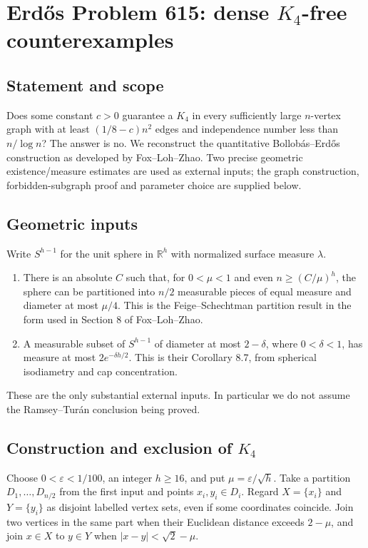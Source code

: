 \section{Erd\H{o}s Problem 615: dense $K_4$-free counterexamples}
\subsection*{Statement and scope}
Does some constant $c>0$ guarantee a $K_4$ in every sufficiently large $n$-vertex graph with at least $(1/8-c)n^2$ edges and independence number less than $n/\log n$? The answer is no. We reconstruct the quantitative Bollob\'as--Erd\H{o}s construction as developed by Fox--Loh--Zhao. Two precise geometric existence/measure estimates are used as external inputs; the graph construction, forbidden-subgraph proof and parameter choice are supplied below.

\subsection*{Geometric inputs}
Write $S^{h-1}$ for the unit sphere in $\mathbb R^h$ with normalized surface measure $\lambda$.
\begin{enumerate}
\item There is an absolute $C$ such that, for $0<\mu<1$ and even $n\ge(C/\mu)^h$, the sphere can be partitioned into $n/2$ measurable pieces of equal measure and diameter at most $\mu/4$. This is the Feige--Schechtman partition result in the form used in Section 8 of Fox--Loh--Zhao.
\item A measurable subset of $S^{h-1}$ of diameter at most $2-\delta$, where $0<\delta<1$, has measure at most $2e^{-\delta h/2}$. This is their Corollary 8.7, from spherical isodiametry and cap concentration.
\end{enumerate}
These are the only substantial external inputs. In particular we do not assume the Ramsey--Tur\'an conclusion being proved.

\subsection*{Construction and exclusion of $K_4$}
Choose $0<\varepsilon<1/100$, an integer $h\ge16$, and put $\mu=\varepsilon/\sqrt h$. Take a partition $D_1,\ldots,D_{n/2}$ from the first input and points $x_i,y_i\in D_i$. Regard $X=\{x_i\}$ and $Y=\{y_i\}$ as disjoint labelled vertex sets, even if some coordinates coincide. Join two vertices in the same part when their Euclidean distance exceeds $2-\mu$, and join $x\in X$ to $y\in Y$ when $|x-y|<\sqrt2-\mu$.

